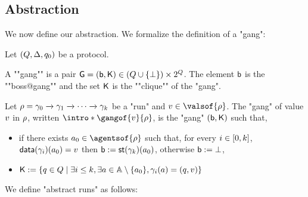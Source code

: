 \subsection{Abstraction}

We now define our abstraction. We formalize the definition of a "gang":

\begin{definition}
	Let $(Q,\Delta, q_0)$ be a protocol.
	
	A ""gang"" is a pair $\mathsf{G} = (\mathsf{b}, \mathsf{K}) \in (Q \cup \{\bot\}) \times 2^{Q}$. The element $\mathsf{b}$ is the ""boss@gang"" and the set $\mathsf{K}$ is the ""clique"" of the "gang". 
	
	Let $\rho = \gamma_0 \xrightarrow{} \gamma_1 \xrightarrow{} \cdots \xrightarrow{} \gamma_k$ be a "run" and $\aval \in \valsof{\run}$. The "gang" of value $v$ in $\rho$, written $\intro*\gangof{\aval}{\run}$, is the "gang" $(\mathsf{b}, \mathsf{K})$ such that, 
	\begin{itemize}
		\item if there exists $a_0 \in \agentsof{\run}$ such that, 
		for every 
		$i \in [0,k]$, 
		$\mathsf{data}(\gamma_i)(a_0) = v$ then $\mathsf{b} := \mathsf{st}(\gamma_k)(a_0)$, otherwise $\mathsf{b} := \bot$, 
		\item  $\mathsf{K} := \{q \in Q \mid \exists i \leq k, \exists a \in \mathbb{A}\setminus \{a_0\}, \gamma_i(a) = (q,v)\}$
	\end{itemize}
\end{definition} 


We define "abstract runs" as follows:
 
